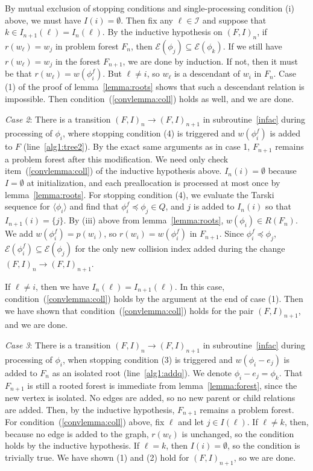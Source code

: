 \documentclass[11pt,reqno]{amsart}
\theoremstyle{definition}
\numberwithin{equation}{section}
\newcommand{\lag}{\langle}
\newcommand{\rag}{\rangle}
\newcommand{\pre}{\phi}
\newcommand{\sub}{\subseteq}
\newcommand{\fix}{\mathcal{E}}
\newcommand{\peq}{\preceq}
\newcommand{\act}{Q}
\newcommand{\coll}{I}
\newcommand{\forest}{F}
\newcommand{\pair}{(F,I)}
\newcommand{\roott}{R}
\begin{document}
By mutual exclusion of stopping conditions and single-processing condition (i) above, we must have $\coll(i) = \emptyset$.
Then fix any $\ell \in \mathcal{I}$ and suppose that $k \in \coll_{n+1}(\ell) = \coll_{n}(\ell)$. 
By the inductive hypothesis on $\pair_n$, if $r(w_{\ell}) = w_j$ in problem forest $\forest_n$, then $\fix(\pre_j) \sub \fix(\pre_k)$. 
If we still have $r(w_{\ell}) = w_j$ in the forest $\forest_{n+1}$, we are done by induction. 
If not, then it must be that $r(w_{\ell}) = w(\pre_i^f)$. 
But $\ell \not = i$, so $w_{\ell}$ is a descendant of $w_i$ in $\forest_n$.
Case (1) of the proof of lemma~\ref{lemma:roots} shows that such a descendant relation is impossible. 
Then condition~(\ref{convlemma:coll}) holds as well, and we are done.

\emph{Case 2}: There is a transition $\pair_n \to \pair_{n +1}$ in subroutine~\ref{infac} during processing of $\pre_i$, where stopping condition (4) is triggered and $w(\pre_i^f)$ is added to $\forest$ (line~\ref{alg1:tree2}). 
By the exact same arguments as in case 1, $F_{n + 1}$ remains a problem forest after this modification. 
We need only check item~(\ref{convlemma:coll}) of the inductive hypothesis above.
$\coll_n(i) = \emptyset$ because $I = \emptyset$ at initialization, and each preallocation is processed at most once by lemma~\ref{lemma:roots}.
For stopping condition (4), we evaluate the Tarski sequence for $\lag \pre_i \rag$ and find that $\pre_i^f \peq \pre_j \in \act$, and $j$ is added to $I_n(i)$ so that $I_{n + 1}(i) = \{j\}$. 
By (iii) above from lemma~\ref{lemma:roots}, $w(\pre_i) \in \roott(\forest_n)$. 
We add $w(\pre_i^f) = p(w_i)$, so $r(w_i) = w(\pre_i^f)$ in $\forest_{n+1}$. 
Since $\pre_i^f \peq \pre_j$, $\fix(\pre_i^f) \sub \fix(\pre_j)$ for the only new collision index added during the change $\pair_n \to \pair_{n+1}$.

If $\ell \not = i$, then we have $\coll_n(\ell) = \coll_{n + 1}(\ell)$. 
In this case, condition~(\ref{convlemma:coll}) holds by the argument at the end of case (1).
Then we have shown that condition~(\ref{convlemma:coll}) holds for the pair $\pair_{n + 1}$, and we are done. 

\emph{Case 3}: There is a transition $\pair_n \to \pair_{n +1}$ in subroutine~\ref{infac} during processing of $\pre_i$, when stopping condition (3) is triggered and $w(\pre_i - e_j)$ is added to $\forest_n$ as an isolated root (line~\ref{alg1:addq}). 
We denote $\pre_i - e_j = \pre_k$.
That $\forest_{n + 1}$ is still a rooted forest is immediate from lemma~\ref{lemma:forest}, since the new vertex is isolated.
No edges are added, so no new parent or child relations are added. 
Then, by the inductive hypothesis, $\forest_{n + 1}$ remains a problem forest.
For condition~(\ref{convlemma:coll}) above, fix $\ell$ and let $j \in \coll(\ell)$.
If $\ell \not = k$, then, because no edge is added to the graph, $r(w_{\ell})$ is unchanged, so the condition holds by the inductive hypothesis. 
If $\ell = k$, then $\coll(i) = \emptyset$, so the condition is trivially true. 
We have shown (1) and (2) hold for $\pair_{n + 1}$, so we are done.
\end{document}
